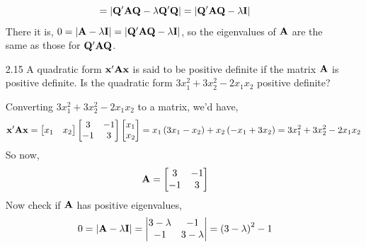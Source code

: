 \begin{enumerate}[font=\bfseries]
\[            =
            \left|\bold{Q}^\prime\bold{A}\bold{Q} - \lambda \bold{Q}^\prime\bold{Q}\right|
            =
            \left|\bold{Q}^\prime\bold{A}\bold{Q} - \lambda \bold{I}\right|
        \]
        There it is, $0 = \left|\bold{A} - \lambda \bold{I}\right| = \left|\bold{Q}^\prime\bold{A}\bold{Q} - \lambda \bold{I}\right|$, so the eigenvalues of $\bold{A}$ are the same as those for $\bold{Q}^\prime\bold{A}\bold{Q}$.
        \item[2.15] A quadratic form $\bold{x}^\prime \bold{A} \bold{x}$ is said to be positive definite if the matrix $\bold{A}$ is positive definite.
        Is the quadratic form $3x_1^2 + 3x_2^2 - 2x_1x_2$ positive definite?
        \par
        Converting $3x_1^2 + 3x_2^2 - 2x_1x_2$ to a matrix, we'd have,
        \[
            \bold{x}^\prime \bold{A} \bold{x} 
            =
            \begin{bmatrix}
                x_1 & x_2
            \end{bmatrix}
            \begin{bmatrix}
                3 & -1 \\
                -1 & 3
            \end{bmatrix}
            \begin{bmatrix}
                x_1 \\
                x_2
            \end{bmatrix}
            =
            x_1\left(3x_1 - x_2\right) + x_2\left(-x_1+3x_2\right)
            =
            3x_1^2 + 3x_2^2 - 2x_1x_2
        \]
        So now,
        \[
            \bold{A}
            =
            \begin{bmatrix}
                3 & -1 \\
                -1 & 3
            \end{bmatrix}
        \]
        Now check if $\bold{A}$ has positive eigenvalues,
        \[
            0
            =
            \left|\bold{A} - \lambda \bold{I}\right|
            =
            \left|
            \begin{matrix}
                3 - \lambda & -1 \\
                -1 & 3 - \lambda
            \end{matrix}
            \right|
            =
            \left(3 - \lambda\right)^2 - 1
\]
\end{enumerate}
